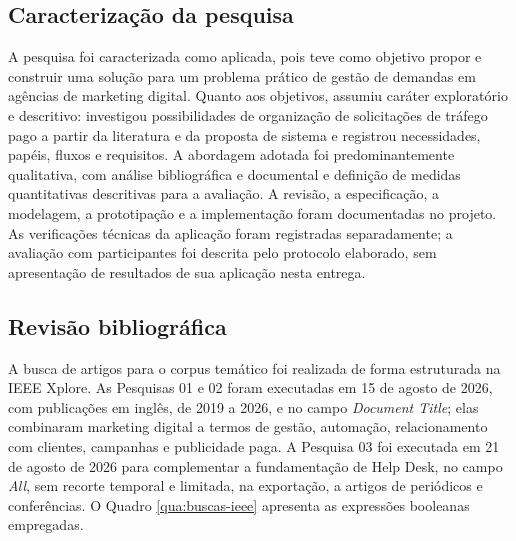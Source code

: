 \subsection{\esp Caracterização da pesquisa}

A pesquisa foi caracterizada como aplicada, pois teve como objetivo propor e construir uma solução para um problema prático de gestão de demandas em agências de marketing digital. Quanto aos objetivos, assumiu caráter exploratório e descritivo: investigou possibilidades de organização de solicitações de tráfego pago a partir da literatura e da proposta de sistema e registrou necessidades, papéis, fluxos e requisitos. A abordagem adotada foi predominantemente qualitativa, com análise bibliográfica e documental e definição de medidas quantitativas descritivas para a avaliação. A revisão, a especificação, a modelagem, a prototipação e a implementação foram documentadas no projeto. As verificações técnicas da aplicação foram registradas separadamente; a avaliação com participantes foi descrita pelo protocolo elaborado, sem apresentação de resultados de sua aplicação nesta entrega.

\subsection{\esp Revisão bibliográfica}

A busca de artigos para o corpus temático foi realizada de forma estruturada na IEEE Xplore. As Pesquisas 01 e 02 foram executadas em 15 de agosto de 2026, com publicações em inglês, de 2019 a 2026, e no campo \textit{Document Title}; elas combinaram marketing digital a termos de gestão, automação, relacionamento com clientes, campanhas e publicidade paga. A Pesquisa 03 foi executada em 21 de agosto de 2026 para complementar a fundamentação de Help Desk, no campo \textit{All}, sem recorte temporal e limitada, na exportação, a artigos de periódicos e conferências. O Quadro \ref{qua:buscas-ieee} apresenta as expressões booleanas empregadas.

